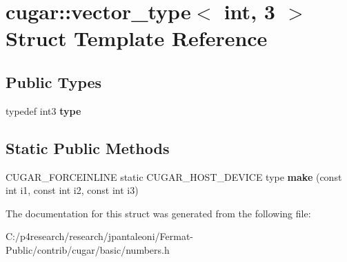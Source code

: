 \hypertarget{structcugar_1_1vector__type_3_01int_00_013_01_4}{}\section{cugar\+:\+:vector\+\_\+type$<$ int, 3 $>$ Struct Template Reference}
\label{structcugar_1_1vector__type_3_01int_00_013_01_4}
\subsection*{Public Types}
\begin{DoxyCompactItemize}
\item 
\mbox{\label{structcugar_1_1vector__type_3_01int_00_013_01_4_a501a3d5571716029df892b2e03eae802}} 
typedef int3 {\bfseries type}
\end{DoxyCompactItemize}
\subsection*{Static Public Methods}
\begin{DoxyCompactItemize}
\item 
\mbox{\label{structcugar_1_1vector__type_3_01int_00_013_01_4_aaae01ee72c18d1b999ba761008e89322}} 
C\+U\+G\+A\+R\+\_\+\+F\+O\+R\+C\+E\+I\+N\+L\+I\+NE static C\+U\+G\+A\+R\+\_\+\+H\+O\+S\+T\+\_\+\+D\+E\+V\+I\+CE type {\bfseries make} (const int i1, const int i2, const int i3)
\end{DoxyCompactItemize}


The documentation for this struct was generated from the following file\+:\begin{DoxyCompactItemize}
\item 
C\+:/p4research/research/jpantaleoni/\+Fermat-\/\+Public/contrib/cugar/basic/numbers.\+h\end{DoxyCompactItemize}
